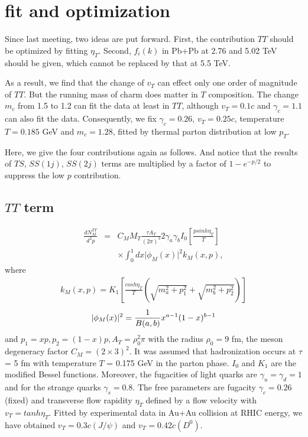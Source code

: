 \documentclass[twocolumn,aps,superscriptaddress,nofootinbib,floatfix]{revtex4}
\begin{document}
\section{fit and optimization}
Since last meeting, two ideas are put forward. First, the contribution $TT$ should be optimized by fitting $\eta_T$. Second, $f_i(k)$ in Pb+Pb at 2.76 and 5.02 TeV should be given, which cannot be replaced by that at 5.5 TeV.

As a result, we find that the change of $v_T$ can effect only one order of magnitude of $TT$. But the running mass of charm does matter in $T$ composition. The change $m_c$ from 1.5 to 1.2 can fit the data at least in $TT$, although $v_T=0.1c$ and $\gamma_c=1.1$ can also fit the data. Consequently, we fix $\gamma_c=0.26$, $v_T=0.25c$, temperature $T=0.185$ GeV and $m_c=1.28$, fitted by thermal parton distribution at low $p_T$.

 Here, we give the four contributions again as follows. And notice that the results of $TS$, $SS(1j)$,  $SS(2j)$ terms are multiplied by a factor of $1-e^{-p/2}$ to suppress the low $p$ contribution.
 
\subsection{$TT$ term} 
\begin{eqnarray}
	\frac{dN^{TT}_{M}}{d^2p}&=&C_M M_T \frac{\tau A_T}{(2\pi)^3}2\gamma_a\gamma_b I_0\left[\frac{psinh\eta_T}{T}\right]  \nonumber\\
	&&\times \int_{0}^{1}dx \vert \phi_M(x)\vert^2 k_M(x,p),
\end{eqnarray}
where 
\begin{eqnarray}
	k_M(x,p)=K_1\left[\frac{cosh\eta_T}{T}(\sqrt{m_a^2+p_1^2}+\sqrt{m_b^2+p_2^2})\right]
\end{eqnarray}
\begin{eqnarray}
	\vert \phi_M(x)\vert^2={1\over B(a,b)}x^{a-1}(1-x)^{b-1}
\end{eqnarray}
and $p_1=xp, p_2=(1-x)p, A_T=\rho_0^2\pi$ with the radius $\rho_0=9$ fm, the meson degeneracy factor $C_M=(2\times3)^2$. It was assumed that hadronization occurs at $\tau$ = 5 fm with temperature $T$ = 0.175 GeV in the parton phase. $I_0$ and $K_1$ are the modified Bessel functions. Moreover, the fugacities of light quarks are $\gamma_u=\gamma_d=1$ and for the strange quarks $\gamma_s=0.8$. The free parameters are fugacity $\gamma_c=0.26$(fixed) and transverse flow rapidity $\eta_T$ defined by a flow velocity with $v_T=tanh \eta_T$. Fitted by experimental data in Au+Au collision at RHIC energy, we have obtained $v_T=0.3c(J/\psi)$ and  $v_T=0.42c(D^0)$.
\end{document}
